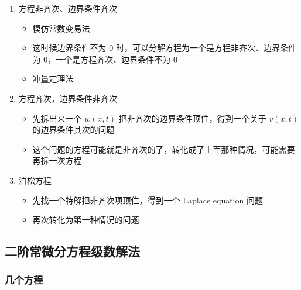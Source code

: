 \documentclass{article}
\begin{document}
\begin{enumerate}
    \item 方程非齐次、边界条件齐次 \begin{itemize}
        \item 模仿常数变易法
        \item 这时候边界条件不为 0 时，可以分解方程为一个是方程非齐次、边界条件为 0，一个是方程齐次、边界条件不为 0
        \item 冲量定理法
    \end{itemize}
    \item 方程齐次，边界条件非齐次 \begin{itemize}
        \item 先拆出来一个 $w(x, t)$ 把非齐次的边界条件顶住，得到一个关于 $v(x, t)$ 的边界条件其次的问题
        \item 这个问题的方程可能就是非齐次的了，转化成了上面那种情况，可能需要再拆一次方程
    \end{itemize}
    \item 泊松方程 \begin{itemize}
        \item 先找一个特解把非齐次项顶住，得到一个 Laplace equation 问题
        \item 再次转化为第一种情况的问题
    \end{itemize}
\end{enumerate}

\subsection{二阶常微分方程级数解法}

\subsubsection{几个方程}
\end{document}
